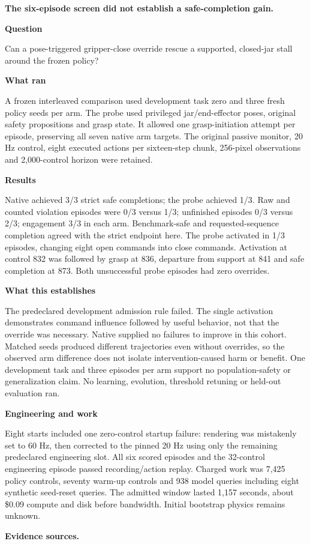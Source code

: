 \documentclass[11pt,a4paper]{article}
\newcommand{\block}[2]{\par\textbf{\color{ink}#1}\par\nopagebreak #2\par}
\newcommand{\finding}[1]{\begin{tcolorbox}[colback=pale,colframe=pale,boxrule=0pt,arc=1mm,left=10pt,right=10pt,top=10pt,bottom=10pt]\color{ink}\large\bfseries #1\end{tcolorbox}}
\begin{document}
\finding{The six-episode screen did not establish a safe-completion gain.}
\block{Question}{Can a pose-triggered gripper-close override rescue a supported, closed-jar stall around the frozen policy?}
\block{What ran}{A frozen interleaved comparison used development task zero and three fresh policy seeds per arm. The probe used privileged jar/end-effector poses, original safety propositions and grasp state. It allowed one grasp-initiation attempt per episode, preserving all seven native arm targets. The original passive monitor, 20 Hz control, eight executed actions per sixteen-step chunk, 256-pixel observations and 2,000-control horizon were retained.}
\block{Results}{Native achieved 3/3 strict safe completions; the probe achieved 1/3. Raw and counted violation episodes were 0/3 versus 1/3; unfinished episodes 0/3 versus 2/3; engagement 3/3 in each arm. Benchmark-safe and requested-sequence completion agreed with the strict endpoint here. The probe activated in 1/3 episodes, changing eight open commands into close commands. Activation at control 832 was followed by grasp at 836, departure from support at 841 and safe completion at 873. Both unsuccessful probe episodes had zero overrides.}
\block{What this establishes}{The predeclared development admission rule failed. The single activation demonstrates command influence followed by useful behavior, not that the override was necessary. Native supplied no failures to improve in this cohort. Matched seeds produced different trajectories even without overrides, so the observed arm difference does not isolate intervention-caused harm or benefit. One development task and three episodes per arm support no population-safety or generalization claim. No learning, evolution, threshold retuning or held-out evaluation ran.}
\block{Engineering and work}{Eight starts included one zero-control startup failure: rendering was mistakenly set to 60 Hz, then corrected to the pinned 20 Hz using only the remaining predeclared engineering slot. All six scored episodes and the 32-control engineering episode passed recording/action replay. Charged work was 7,425 policy controls, seventy warm-up controls and 938 model queries including eight synthetic seed-reset queries. The admitted window lasted 1,157 seconds, about \$0.09 compute and disk before bandwidth. Initial bootstrap physics remains unknown.}
\vfill{\footnotesize\color{muted}\textbf{Evidence sources.}\par
\raggedright {}\par {}\par {}}
\clearpage
\end{document}

